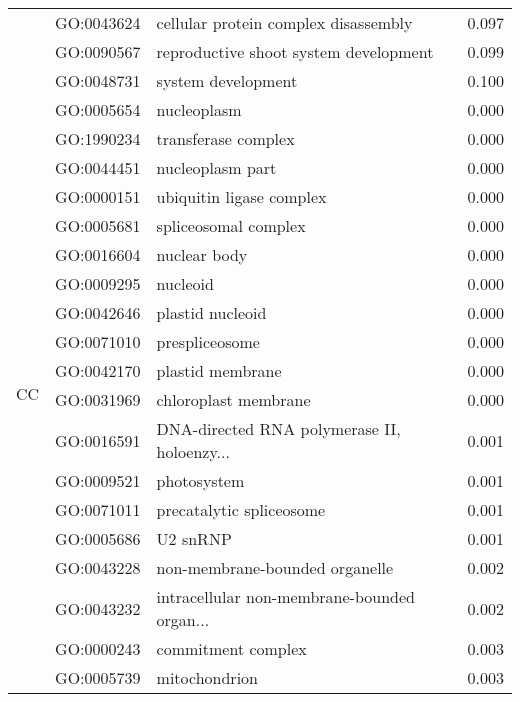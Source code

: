 \begin{longtable}{lllr}
   & GO:0043624 &         cellular protein complex disassembly &         0.097 \\
   & GO:0090567 &        reproductive shoot system development &         0.099 \\
   & GO:0048731 &                           system development &         0.100 \\
\cline{1-4}
\multirow{51}{*}{CC} & GO:0005654 &                                  nucleoplasm &         0.000 \\
   & GO:1990234 &                          transferase complex &         0.000 \\
   & GO:0044451 &                             nucleoplasm part &         0.000 \\
   & GO:0000151 &                     ubiquitin ligase complex &         0.000 \\
   & GO:0005681 &                         spliceosomal complex &         0.000 \\
   & GO:0016604 &                                 nuclear body &         0.000 \\
   & GO:0009295 &                                     nucleoid &         0.000 \\
   & GO:0042646 &                             plastid nucleoid &         0.000 \\
   & GO:0071010 &                               prespliceosome &         0.000 \\
   & GO:0042170 &                             plastid membrane &         0.000 \\
   & GO:0031969 &                         chloroplast membrane &         0.000 \\
   & GO:0016591 &  DNA-directed RNA polymerase II, holoenzy... &         0.001 \\
   & GO:0009521 &                                  photosystem &         0.001 \\
   & GO:0071011 &                     precatalytic spliceosome &         0.001 \\
   & GO:0005686 &                                     U2 snRNP &         0.001 \\
   & GO:0043228 &               non-membrane-bounded organelle &         0.002 \\
   & GO:0043232 &  intracellular non-membrane-bounded organ... &         0.002 \\
   & GO:0000243 &                           commitment complex &         0.003 \\
   & GO:0005739 &                                mitochondrion &         0.003 \\

\end{longtable}
